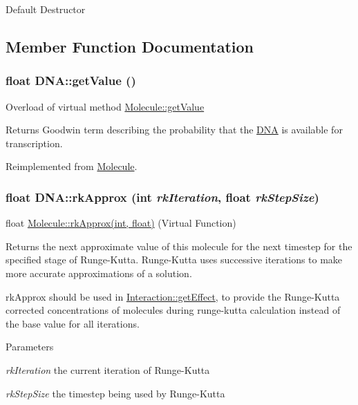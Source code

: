 Default Destructor 

\subsection{Member Function Documentation}
\hypertarget{classDNA_ac3f4ef00894483313ea44df6a85b3bab}{
\subsubsection[{getValue}]{\setlength{\rightskip}{0pt plus 5cm}float DNA::getValue ()}}
\label{classDNA_ac3f4ef00894483313ea44df6a85b3bab}
Overload of virtual method \hyperlink{classMolecule_a554ea822918374775d5f52b5d49d8195}{Molecule::getValue}

\begin{DoxyReturn}{Returns}
Goodwin term describing the probability that the \hyperlink{classDNA}{DNA} is available for transcription. 
\end{DoxyReturn}


Reimplemented from \hyperlink{classMolecule_a554ea822918374775d5f52b5d49d8195}{Molecule}.\hypertarget{classDNA_a10bec8cdc5922b2780887666c53891f1}{
\subsubsection[{rkApprox}]{\setlength{\rightskip}{0pt plus 5cm}float DNA::rkApprox (int {\em rkIteration}, \/  float {\em rkStepSize})}}
\label{classDNA_a10bec8cdc5922b2780887666c53891f1}
float \hyperlink{classMolecule_adabb58a65655a7f55dae0d82b65d04ba}{Molecule::rkApprox(int, float)} (Virtual Function)

Returns the next approximate value of this molecule for the next timestep for the specified stage of Runge-\/Kutta. Runge-\/Kutta uses successive iterations to make more accurate approximations of a solution.

rkApprox should be used in \hyperlink{classInteraction_a6328831e714adf9c8177f6052d2e017f}{Interaction::getEffect}, to provide the Runge-\/Kutta corrected concentrations of molecules during runge-\/kutta calculation instead of the base value for all iterations.


\begin{DoxyParams}{Parameters}
\item[{\em rkIteration}]the current iteration of Runge-\/Kutta \item[{\em rkStepSize}]the timestep being used by Runge-\/Kutta \end{DoxyParams}


